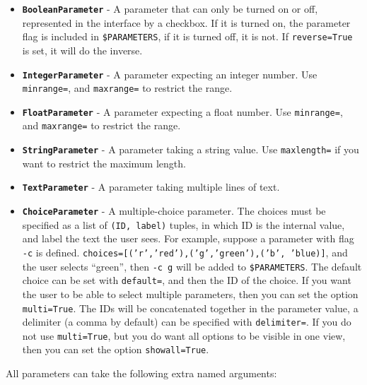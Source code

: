\documentclass[a4paper,12pt]{report}
\begin{document}
\begin{itemize}
\item \textbf{\texttt{BooleanParameter}} - A parameter that can only be turned on or off, represented in the interface by a checkbox. If it is turned on, the parameter flag is included in \texttt{\$PARAMETERS}, if it is turned off, it is not. If \texttt{reverse=True} is set, it will do the inverse.
\item \textbf{\texttt{IntegerParameter}} - A parameter expecting an integer number. Use \texttt{minrange=}, and \texttt{maxrange=} to restrict the range.
\item \textbf{\texttt{FloatParameter}} - A parameter expecting a float number. Use \texttt{minrange=}, and \texttt{maxrange=} to restrict the range.
\item \textbf{\texttt{StringParameter}} - A parameter taking a string value. Use \texttt{maxlength=} if you want to restrict the maximum length.
\item \textbf{\texttt{TextParameter}} - A parameter taking multiple lines of text. 
\item \textbf{\texttt{ChoiceParameter}} - A multiple-choice parameter. The choices must be specified as a list of \texttt{(ID, label)} tuples, in which ID is the internal value, and label the text the user sees. For example, suppose a parameter with flag \texttt{-c} is defined.  \texttt{choices=[('r','red'),('g','green'),('b', 'blue)]}, and the user selects ``green'', then  \texttt{-c g} will be added to \texttt{\$PARAMETERS}. The default choice can be set with \texttt{default=}, and then the ID of the choice. If you want the user to be able to select multiple parameters, then you can set the option \texttt{multi=True}. The IDs will be concatenated together in the parameter value, a delimiter (a comma by default) can be specified with \texttt{delimiter=}. If you do not use \texttt{multi=True}, but you do want all options to be visible in one view, then you can set the option \texttt{showall=True}.
\end{itemize}

All parameters can take the following extra named arguments:
\end{document}
